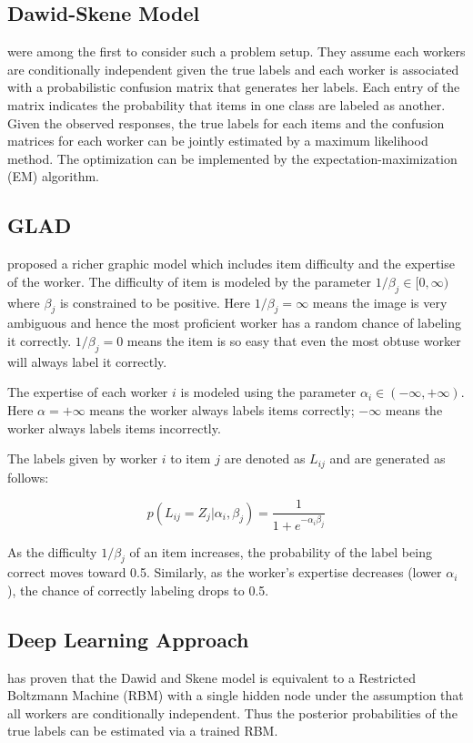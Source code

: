 \documentclass{article}
\begin{document}
\subsection{Dawid-Skene Model}
\cite{dawid1979maximum} were among the first to consider such a
problem setup. They assume each workers are conditionally independent
given the true labels and each worker is associated with a
probabilistic confusion matrix that generates her labels. Each entry
of the matrix indicates the probability that items in one class are
labeled as another. Given the
observed responses, the true labels for each items and the confusion
matrices for each worker can be jointly estimated by a maximum
likelihood method. The optimization can be implemented by the
expectation-maximization (EM) algorithm.


\subsection{GLAD}
\cite{NIPS2009_3644} proposed a richer graphic model which includes
item difficulty and the expertise of the worker. The difficulty of
item is modeled by the parameter $1/\beta_j \in [0,\infty)$ where
$\beta_j$ is constrained to be positive. Here $1/\beta_j = \infty$
means the image is very ambiguous and hence the most proficient worker
has a random chance of labeling it correctly. $1/\beta_j = 0$ means the item is
so easy that even the most obtuse worker will always label it correctly.

The expertise of each worker $i$ is modeled using the parameter
$\alpha_i \in (-\infty, +\infty)$. Here $\alpha = +\infty$ means the
worker always labels items correctly; $-\infty$ means the worker
always labels items incorrectly.

The labels given by worker $i$ to item $j$ are denoted as $L_{ij}$
and are generated as follows:

\begin{equation} \label{eq:glad_label}
  p(L_{ij}=Z_j|\alpha_i , \beta_j) = \frac{1}{1+e^{-\alpha_i \beta_j}}
\end{equation}

As the difficulty $1/\beta_j$ of an item increases, the probability of
the label being correct moves toward 0.5. Similarly, as the worker's
expertise decreases (lower $\alpha_i$), the chance of correctly
labeling drops to 0.5.
\subsection{Deep Learning Approach}
\cite{Shaham2016-nh} has proven that the Dawid and Skene model is
equivalent to a Restricted Boltzmann Machine (RBM) with a single
hidden node under the assumption that all workers are conditionally
independent. Thus the posterior probabilities of the true labels can
be estimated via a trained RBM.
\end{document}
